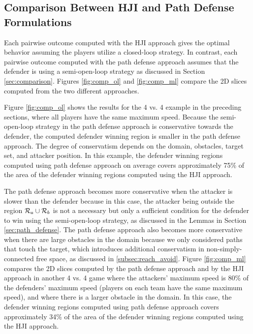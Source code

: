\subsection{Comparison Between HJI and Path Defense Formulations}
Each pairwise outcome computed with the HJI approach gives the optimal behavior assuming the players utilize a closed-loop strategy. In contrast, each pairwise outcome computed with the path defense approach assumes that the defender is using a semi-open-loop strategy as discussed in Section \ref{sec:comparison}. Figures \ref{fig:comp_ol} and \ref{fig:comp_ml} compare the 2D slices computed from the two different approaches.

Figure \ref{fig:comp_ol} shows the results for the 4 vs. 4 example in the preceding sections, where all players have the same maximum speed. Because the semi-open-loop strategy in the path defense approach is conservative towards the defender, the computed defender winning region is smaller in the path defense approach. The degree of conservatism depends on the domain, obstacles, target set, and attacker position. In this example, the defender winning regions computed using path defense approach on average covers approximately 75\% of the area of the defender winning regions computed using the HJI approach.

The path defense approach becomes more conservative when the attacker is slower than the defender because in this case, the attacker being outside the region $\mathcal{R}_a \cup \mathcal{R}_b$ is not a necessary but only a sufficient condition for the defender to win using the semi-open-loop strategy, as discussed in the Lemmas in Section \ref{sec:path_defense}. The path defense approach also becomes more conservative when there are large obstacles in the domain because we only considered paths that touch the target, which introduces additional conservatism in non-simply-connected free space, as discussed in \ref{subsec:reach_avoid}. Figure \ref{fig:comp_ml} compares the 2D slices computed by the path defense approach and by the HJI approach in another 4 vs. 4 game where the attackers' maximum speed is 80\% of the defenders' maximum speed (players on each team have the same maximum speed), and where there is a larger obstacle in the domain. In this case,  the defender winning regions computed using path defense approach covers approximately 34\% of the area of the defender winning regions computed using the HJI approach.

